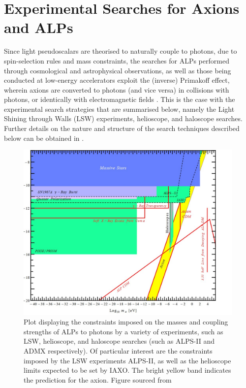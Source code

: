 \section{Experimental Searches for Axions and ALPs}\label{ALPExpt} 
Since light pseudoscalars are theorised to naturally couple to photons, due to spin-selection rules and mass constraints, the searches for ALPs performed through cosmological and astrophysical observations, as well as those
being conducted at low-energy accelerators exploit the (inverse) Primakoff effect, wherein axions are converted to photons (and vice versa) in collisions with photons, or identically with electromagnetic fields \cite{d'Enterria:2753504}. This is the case with the experimental search strategies
that are summarised below, namely the Light Shining through Walls (LSW) experiments, helioscope, and haloscope searches. Further details on the nature and structure of the search techniques described below can be obtained in \cite{doi:10.1146/annurev-nucl-102014-022120}.
\begin{figure}[H]
    \centering      
    \includegraphics[scale = 0.45]{ALPExperimentalConstraints.jpg}
    \caption{Plot displaying the constraints imposed on the masses and coupling strengths of ALPs to photons by a variety of experiments, such as LSW, helioscope, and haloscope searches (such as ALPS-II and ADMX respectively). Of particular interest are the constraints imposed by the LSW experiments ALPS-II, as well as the helioscope limits expected to be set by IAXO. The bright yellow band indicates
    the prediction for the axion. Figure sourced from \cite{https://doi.org/10.48550/arxiv.1407.0546}}
    \label{ALPExperimentalConstraints}
\end{figure}
